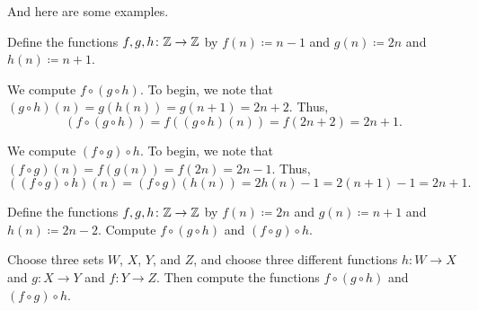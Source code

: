 \documentclass[../notes.tex]{subfiles}
\begin{document}
And here are some examples.
\begin{example}
    Define the functions $f,g,h\colon\mathbb Z\to\mathbb Z$ by $f(n)\coloneqq n-1$ and $g(n)\coloneqq 2n$ and $h(n)\coloneqq n+1$.
    \begin{listalph}
        \item We compute $f\circ(g\circ h)$. To begin, we note that $(g\circ h)(n)=g(h(n))=g(n+1)=2n+2$. Thus,
        \[(f\circ(g\circ h))=f((g\circ h)(n))=f(2n+2)=2n+1.\]
        \item We compute $(f\circ g)\circ h$. To begin, we note that $(f\circ g)(n)=f(g(n))=f(2n)=2n-1$. Thus,
        \[((f\circ g)\circ h)(n)=(f\circ g)(h(n))=2h(n)-1=2(n+1)-1=2n+1.\]
    \end{listalph}
\end{example}
\begin{exe}
    Define the functions $f,g,h\colon\mathbb Z\to\mathbb Z$ by $f(n)\coloneqq2n$ and $g(n)\coloneqq n+1$ and $h(n)\coloneqq 2n-2$. Compute $f\circ(g\circ h)$ and $(f\circ g)\circ h$.
\end{exe}
\begin{exe}
    Choose three sets $W$, $X$, $Y$, and $Z$, and choose three different functions $h\colon W\to X$ and $g\colon X\to Y$ and $f\colon Y\to Z$. Then compute the functions $f\circ(g\circ h)$ and $(f\circ g)\circ h$.
\end{exe}
\end{document}
